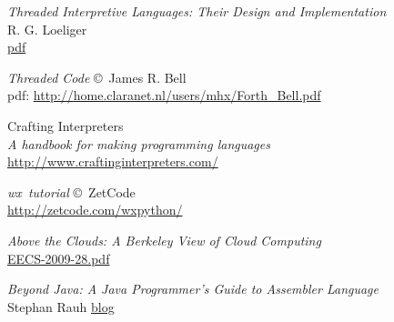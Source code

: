 \begin{thebibliography}{99}
 \emph{Threaded Interpretive Languages: Their Design and
Implementation}\\ R. G. Loeliger \\
\href{http://sinclairql.speccy.org/archivo/docs/books/Threaded_interpretive_languages.pdf}{pdf}

 \emph{Threaded Code} \copyright\ James R. Bell\\
pdf: \url{http://home.claranet.nl/users/mhx/Forth_Bell.pdf}

 Crafting Interpreters\\
\emph{A handbook for making programming languages}\\
\url{http://www.craftinginterpreters.com/}

 \emph{wx\py\ tutorial} \copyright\ ZetCode\\
	\url{http://zetcode.com/wxpython/}

 \emph{Above the Clouds: A Berkeley View of Cloud Computing} \\
\href{https://www2.eecs.berkeley.edu/Pubs/TechRpts/2009/EECS-2009-28.pdf}{EECS-2009-28.pdf}

 \emph{Beyond Java: A Java Programmer’s Guide to Assembler
Language}\\
Stephan Rauh
\href{http://www.beyondjava.net/blog/java-programmers-guide-assembler-language/}{blog} 


\end{thebibliography}
